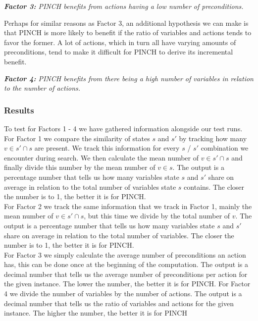 \begin{center}
\textit{\textbf{Factor 3:} PINCH benefits from actions having a low number of preconditions.}
\end{center}
Perhaps for similar reasons as Factor 3, an additional hypothesis we can make is that PINCH is more likely to benefit if the ratio of variables and actions tends to favor the former. A lot of actions, which in turn all have varying amounts of preconditions, tend to make it difficult for PINCH to derive its incremental benefit. 
\begin{center}
\textit{\textbf{Factor 4:} PINCH benefits from there being a high number of variables in relation to the number of actions.}
\end{center}
\newpage
\subsubsection{Results}
To test for Factors 1 - 4 we have gathered information alongside our test runs. For Factor 1 we compare the similarity of states $s$ and $s'$ by tracking how many $v \in s' \cap s$ are present. We track this information for every $s$ / $s'$ combination we encounter during search. We then calculate the mean number of $v \in s' \cap s$ and finally divide this number by the mean number of $v \in s$. The output is a percentage number that tells us how many variables state $s$ and $s'$ share on average in relation to the total number of variables state $s$ contains. The closer the number is to 1, the better it is for PINCH.\\

For Factor 2 we track the same information that we track in Factor 1, mainly the mean number of $v \in s' \cap s$, but this time we divide by the total number of $v$. The output is a percentage number that tells us how many variables state $s$ and $s'$ share on average in relation to the total number of variables. The closer the number is to 1, the better it is for PINCH.\\

For Factor 3 we simply calculate the average number of preconditions an action has, this can be done once at the beginning of the computation. The output is a decimal number that tells us the average number of preconditions per action for the given instance. The lower the number, the better it is for PINCH. For Factor 4 we divide the number of variables by the number of actions. The output is a decimal number that tells us the ratio of variables and actions for the given instance. The higher the number, the better it is for PINCH\\

